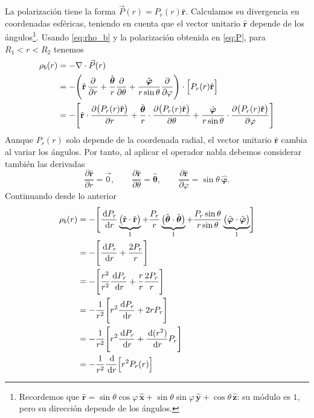 \documentclass[11pt]{article}
\newcommand{\er}{\hat{\mathbf r}}
\newcommand{\dd}{\,\mathrm d}
\begin{document}
La polarización tiene la forma $\vec P(r)=P_r(r)\er$.
Calculamos su divergencia en coordenadas esféricas, teniendo
en cuenta que el vector unitario $\er$ depende de los
ángulos\footnote{Recordemos que
$\er=\sin\theta\cos\varphi\,\hat{\mathbf x}
+\sin\theta\sin\varphi\,\hat{\mathbf y}
+\cos\theta\,\hat{\mathbf z}$:
su módulo es $1$, pero su dirección depende de los ángulos.}.
Usando \eqref{eq:rho_b} y la polarización obtenida en
\eqref{eq:P}, para $R_1<r<R_2$ tenemos
\begin{align}
  \rho_b(r)
    &=-\nabla\cdot\vec P(r)
      \notag\\
    &=-\Biggl(
        \er\,\frac{\partial}{\partial r}
        +\frac{\hat{\boldsymbol{\theta}}}{r}
          \frac{\partial}{\partial\theta}
        +\frac{\hat{\boldsymbol{\varphi}}}{r\sin\theta}
          \frac{\partial}{\partial\varphi}
      \Biggr)
      \cdot\Bigl[P_r(r)\er\Bigr]
      \notag\\
    &=-\Biggl[
        \er\cdot
          \frac{\partial\bigl(P_r(r)\er\bigr)}{\partial r}
        +\frac{\hat{\boldsymbol{\theta}}}{r}\cdot
          \frac{\partial\bigl(P_r(r)\er\bigr)}{\partial\theta}
        +\frac{\hat{\boldsymbol{\varphi}}}{r\sin\theta}\cdot
          \frac{\partial\bigl(P_r(r)\er\bigr)}{\partial\varphi}
      \Biggr]
\end{align}
Aunque $P_r(r)$ solo depende de la coordenada radial, el vector
unitario $\er$ cambia al variar los ángulos. Por tanto, al aplicar
el operador nabla debemos considerar también las derivadas
\[
  \frac{\partial\er}{\partial r}=\vec0,
  \qquad
  \frac{\partial\er}{\partial\theta}
    =\hat{\boldsymbol{\theta}},
  \qquad
  \frac{\partial\er}{\partial\varphi}
    =\sin\theta\,\hat{\boldsymbol{\varphi}}.
\]
Continuando desde lo anterior
\begin{align}
    \rho_b(r)&=-\Biggl[
        \frac{\dd P_r}{\dd r}
          \underbrace{\bigl(\er\cdot\er\bigr)}_{1}
        +\frac{P_r}{r}
          \underbrace{
            \bigl(
              \hat{\boldsymbol{\theta}}
              \cdot\hat{\boldsymbol{\theta}}
            \bigr)
          }_{1}
        +\frac{P_r\sin\theta}{r\sin\theta}
          \underbrace{
            \bigl(
              \hat{\boldsymbol{\varphi}}
              \cdot\hat{\boldsymbol{\varphi}}
            \bigr)
          }_{1}
      \Biggr]
      \notag\\
    &=-\Biggl[
        \frac{\dd P_r}{\dd r}+\frac{2P_r}{r}
      \Biggr]
      \notag\\
    &=-\Biggl[
        \frac{r^2}{r^2}\frac{\dd P_r}{\dd r}+\frac{r}{r}\frac{2P_r}{r}
      \Biggr]
      \notag\\
    &=-\frac{1}{r^2}\Biggl[
        r^2\frac{\dd P_r}{\dd r}+2rP_r
      \Biggr]
      \notag\\
    &=-\frac{1}{r^2}\Biggl[
        r^2\frac{\dd P_r}{\dd r}
        +\frac{\dd(r^2)}{\dd r}P_r
      \Biggr]
      \notag\\
    &=-\frac{1}{r^2}\frac{\dd}{\dd r}
      \Bigl[r^2P_r(r)\Bigr] \notag
\end{align}
\end{document}
